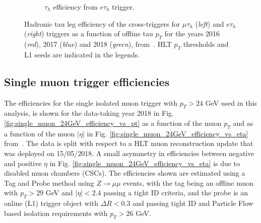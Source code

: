 \begin{figure}[ht]
\begin{subfigure}{0.45\textwidth}
        \caption{$\tau_{h}$ efficiency from $e\tau_{h}$ trigger.}
        \label{fig:etauEfficiencyPt_eachYear_mediumTauMVA_Data}
    \end{subfigure}
    \caption[Hadronic tau leg efficiency of the cross-triggers for $\mu\tau_{h}$ (\textit{left}) and $e\tau_{h}$ (\textit{right}) triggers as a function of offline tau $p_{T}$ for 2016, 2017, and 2018.]{Hadronic tau leg efficiency of the cross-triggers for $\mu\tau_{h}$ (\textit{left}) and $e\tau_{h}$ (\textit{right}) triggers as a function of offline tau $p_{T}$ for the years 2016 (\textit{red}), 2017 (\textit{blue}) and 2018 (\textit{green}), from~\cite{twiki_Tau_Lepton_Run_2_trigger_performance}. HLT $p_{T}$ thresholds and L1 seeds are indicated in the legends.} 
\end{figure}


\subsection{Single muon trigger efficiencies}
The efficiencies for the single isolated muon trigger with $p_{T} > 24$ GeV used in this analysis, is shown for the data-taking year 2018 in Fig. \ref{fig:single_muon_24GeV_efficiency_vs_pt} as a function of the muon $p_{T}$ and as a function of the muon $|\eta|$ in Fig. \ref{fig:single_muon_24GeV_efficiency_vs_eta} from~\cite{CMS-DP-2018-034}. The data is split with respect to a HLT muon reconstruction update that was deployed on 15/05/2018. A small asymmetry in efficiencies between negative and positive $\eta$ in Fig. \ref{fig:single_muon_24GeV_efficiency_vs_eta} is due to disabled muon chambers (CSCs). The efficiencies shown are estimated using a Tag and Probe method using $Z\rightarrow \mu\mu$ events, with the tag being an offline muon with $p_{T} > 29$ GeV and $|\eta| < 2.4$ passing a tight ID criteria, and the probe is an online (L1) trigger object with $\Delta R < 0.3$ and passing tight ID and Particle Flow based isolation requirements with $p_{T} > 26$ GeV.

